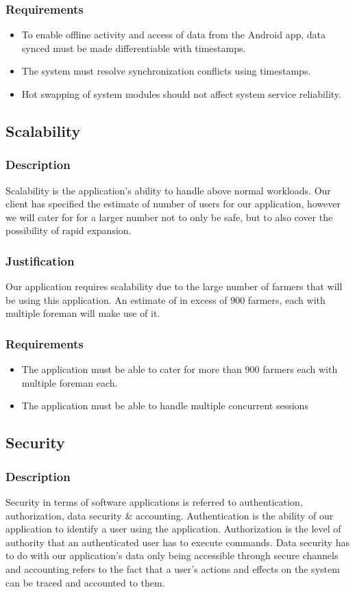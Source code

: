 \documentclass[11pt,fleqn]{book} %
\begin{document}
			\subsubsection{Requirements}
			\begin{itemize}
				\item To enable offline activity and access of data from the Android app, data synced must be made differentiable with timestamps.
				\item The system must resolve synchronization conflicts using timestamps.
				\item Hot swapping of system modules should not affect system service reliability.
			\end{itemize}
		\subsection{Scalability}
			\subsubsection{Description}
				Scalability is the application’s ability to handle above normal workloads. Our client has specified the estimate of number of users for our application, however we will cater for for a larger number not to only be safe, but to also cover the possibility of rapid expansion.
			\subsubsection{Justification}
				Our application requires scalability due to the large number of farmers that will be using this application. An estimate of in excess of 900 farmers, each with multiple foreman will make use of it.
			\subsubsection{Requirements}
				\begin{itemize}
					\item The application must be able to cater for more than 900 farmers each with multiple foreman each.
					\item The application must be able to handle multiple concurrent sessions
				\end{itemize}
		\subsection{Security}
			\subsubsection{Description}
				Security in terms of software applications is referred to authentication, authorization, data security & accounting. Authentication is the ability of our application to identify a user using the application. Authorization is the level of authority that an authenticated user has to execute commands. Data security has to do with our application’s data only being accessible through secure channels and accounting refers to the fact that a user’s actions and effects on the system can be traced and accounted to them.
\end{document}
